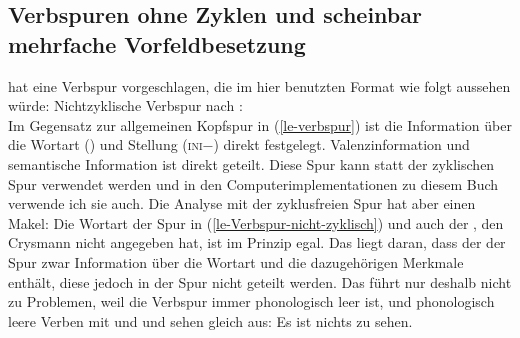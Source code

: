 \subsection{Verbspuren ohne Zyklen und scheinbar mehrfache Vorfeldbesetzung}
\label{Abschnitt-Verbspuren ohne Zyklen}

\citet[57]{Crysmann2022a} hat eine Verbspur vorgeschlagen, die im hier benutzten Format wie folgt
aussehen würde:
\eas
\label{le-Verbspur-nicht-zyklisch}%
Nichtzyklische Verbspur nach \citet[57]{Crysmann2022a}:\\
\zs
Im Gegensatz zur allgemeinen Kopfspur in (\ref{le-verbspur}) ist die Information über die Wortart ()
und Stellung (\textsc{ini}$-$) direkt festgelegt. Valenzinformation und semantische Information ist
direkt geteilt. Diese Spur kann statt der zyklischen Spur verwendet werden und in den
Computerimplementationen zu diesem Buch verwende ich sie auch. Die Analyse mit der zyklusfreien Spur
hat aber einen Makel: Die Wortart der Spur in (\ref{le-Verbspur-nicht-zyklisch}) und
auch der \vformw, den Crysmann nicht angegeben hat, ist im Prinzip egal. Das liegt daran, dass der \dslw der Spur zwar Information über
die Wortart und die dazugehörigen Merkmale enthält, diese jedoch in der Spur nicht geteilt
werden. Das führt nur deshalb nicht zu Problemen, weil die Verbspur immer phonologisch leer ist, und
phonologisch leere Verben mit \vform {} und \vform {} und \vform {} sehen
gleich aus: Es ist nichts zu sehen.


